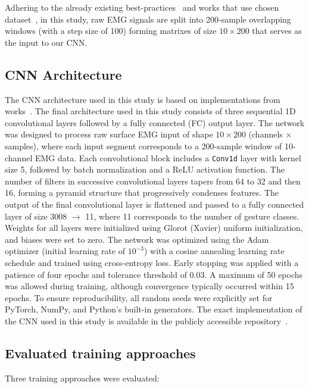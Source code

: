 Adhering to the already existing best-practices~\cite{Smith2011} and works that use chosen dataset~\cite{Cote2019_3DC,LibEMG2023}, in this study, raw EMG signals are split into 200-sample overlapping windows (with a step size of 100) forming matrixes of size $10 \times 200$ that serves as the input to our CNN. 

\subsection*{CNN Architecture}
The CNN architecture used in this study is based on implementations from works~\cite{Cote2019_3DC,LibEMG2023}. 
The final architecture used in this study consists of three sequential 1D convolutional layers followed by a fully connected (FC) output layer. The network was designed to process raw surface EMG input of shape $10 \times 200$ (channels × samples), where each input segment corresponds to a 200-sample window of 10-channel EMG data.
Each convolutional block includes a \texttt{Conv1d} layer with kernel size 5, followed by batch normalization and a ReLU activation function. The number of filters in successive convolutional layers tapers from 64 to 32 and then 16, forming a pyramid structure that progressively condenses features. The output of the final convolutional layer is flattened and passed to a fully connected layer of size 3008 $\rightarrow$ 11, where 11 corresponds to the number of gesture classes.
Weights for all layers were initialized using Glorot (Xavier) uniform initialization, and biases were set to zero. The network was optimized using the Adam optimizer (initial learning rate of $10^{-3}$) with a cosine annealing learning rate schedule and trained using cross-entropy loss. Early stopping was applied with a patience of four epochs and tolerance threshold of 0.03. A maximum of 50 epochs was allowed during training, although convergence typically occurred within 15 epochs. To ensure reproducibility, all random seeds were explicitly set for PyTorch, NumPy, and Python’s built-in generators.
The exact implementation of the CNN used in this study is available in the publicly accessible repository~\cite{Kolomiiets2025}.

\subsection*{Evaluated training approaches}

Three training approaches were evaluated:

